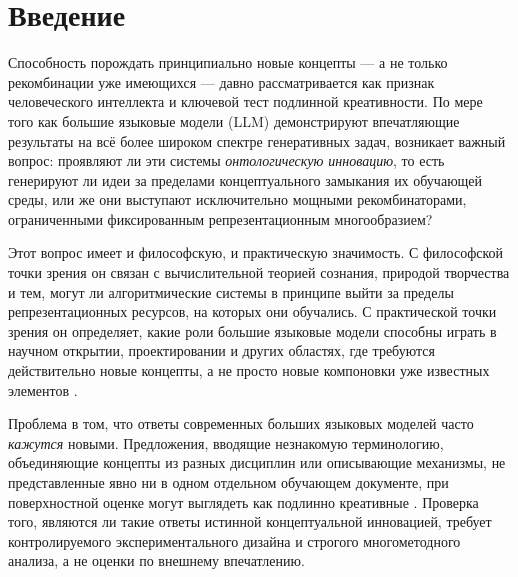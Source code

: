 \documentclass[sn-mathphys-num]{sn-jnl}
\begin{document}

\maketitle

\section{Введение}
\label{sec:intro}

Способность порождать принципиально новые концепты --- а не только рекомбинации уже имеющихся --- давно рассматривается как признак человеческого интеллекта и ключевой тест подлинной креативности. По мере того как большие языковые модели (LLM) демонстрируют впечатляющие результаты на всё более широком спектре генеративных задач, возникает важный вопрос: проявляют ли эти системы \emph{онтологическую инновацию}, то есть генерируют ли идеи за пределами концептуального замыкания их обучающей среды, или же они выступают исключительно мощными рекомбинаторами, ограниченными фиксированным репрезентационным многообразием?

Этот вопрос имеет и философскую, и практическую значимость. С философской точки зрения он связан с вычислительной теорией сознания, природой творчества и тем, могут ли алгоритмические системы в принципе выйти за пределы репрезентационных ресурсов, на которых они обучались. С практической точки зрения он определяет, какие роли большие языковые модели способны играть в научном открытии, проектировании и других областях, где требуются действительно новые концепты, а не просто новые компоновки уже известных элементов \cite{kuhn1962structure}.

Проблема в том, что ответы современных больших языковых моделей часто \emph{кажутся} новыми. Предложения, вводящие незнакомую терминологию, объединяющие концепты из разных дисциплин или описывающие механизмы, не представленные явно ни в одном отдельном обучающем документе, при поверхностной оценке могут выглядеть как подлинно креативные \cite{wiggins2006preliminary,colton2012computational}. Проверка того, являются ли такие ответы истинной концептуальной инновацией, требует контролируемого экспериментального дизайна и строгого многометодного анализа, а не оценки по внешнему впечатлению.
\end{document}
